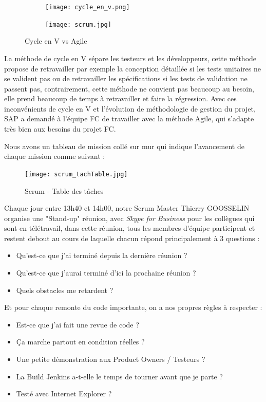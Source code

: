     \begin{figure}[H]
       	\centering
    	\begin{subfigure}[b]{.4\textwidth}
    		\texttt{[image: cycle\_en\_v.png]}
    	\end{subfigure}
    	\begin{subfigure}[b]{.59\textwidth}
    		\texttt{[image: scrum.jpg]}
    	\end{subfigure}
    	
    	\caption{Cycle en V vs Agile}
    	\label{fig: cycle_en_v}
    \end{figure}
    La méthode de cycle en V sépare les testeurs et les développeurs, cette méthode propose de retravailler par exemple la conception détaillée si les tests unitaires ne se valident pas ou de retravailler les spécifications si les tests de validation ne passent pas, contrairement, cette méthode ne convient pas beaucoup au besoin, elle prend beaucoup de temps à retravailler et faire la régression. Avec ces inconvénients de cycle en V et l'évolution de méthodologie de gestion du projet, SAP a demandé à l'équipe FC de travailler avec la méthode Agile, qui s'adapte très bien aux besoins du projet FC. 
    
    \par Nous avons un tableau de mission collé sur mur qui indique l'avancement de chaque mission comme suivant : 
    \begin{figure}[H]
        \centering
        \texttt{[image: scrum\_tachTable.jpg]}
        \caption{Scrum - Table des tâches}
        \label{fig:scrum_figure}
    \end{figure}
    \par Chaque jour entre 13h40 et 14h00, notre Scrum Master Thierry GOOSSELIN organise une "Stand-up" réunion, avec \textit{Skype for Business} pour les collègues qui sont en télétravail, dans cette réunion, tous les membres d'équipe participent et restent debout au cours de laquelle chacun répond principalement à 3 questions : 
    \begin{itemize}[label=\textbullet]
        \item Qu'est-ce que j'ai terminé depuis la dernière réunion ?
        \item Qu'est-ce que j'aurai terminé d'ici la prochaine réunion ?
        \item Quels obstacles me retardent ?
    \end{itemize}
    
    \par Et pour chaque remonte du code importante, on a nos propres règles à respecter : 
    \begin{itemize}[label=\textbullet]
        \item Est-ce que j'ai fait une revue de code ?
        \item Ça marche partout en condition réelles ?
        \item Une petite démonstration aux Product Owners / Testeurs ?
        \item La Build Jenkins a-t-elle le temps de tourner avant que je parte ?
        \item Testé avec Internet Explorer ?
    \end{itemize}


